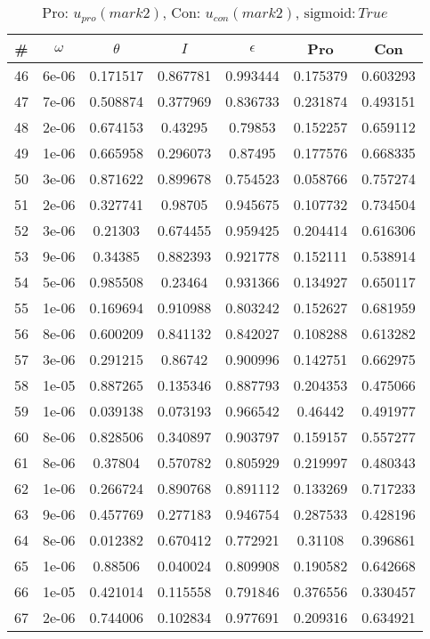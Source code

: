 \newpage
\begin{table}
\caption{Pro: $u_{pro} (mark 2)$, Con: $u_{con} (mark 2)$, $\mathrm{sigmoid}: True$}
\begin{tabular*}{\linewidth}{c|c|c|c|c|c|c}
\# & $\omega$ & $\theta$ & $I$ & $\epsilon$ & Pro & Con \\
\hline
46 & 6e-06 & 0.171517 & 0.867781 & 0.993444 & 0.175379 & 0.603293\\
47 & 7e-06 & 0.508874 & 0.377969 & 0.836733 & 0.231874 & 0.493151\\
48 & 2e-06 & 0.674153 & 0.43295 & 0.79853 & 0.152257 & 0.659112\\
49 & 1e-06 & 0.665958 & 0.296073 & 0.87495 & 0.177576 & 0.668335\\
50 & 3e-06 & 0.871622 & 0.899678 & 0.754523 & 0.058766 & 0.757274\\
51 & 2e-06 & 0.327741 & 0.98705 & 0.945675 & 0.107732 & 0.734504\\
52 & 3e-06 & 0.21303 & 0.674455 & 0.959425 & 0.204414 & 0.616306\\
53 & 9e-06 & 0.34385 & 0.882393 & 0.921778 & 0.152111 & 0.538914\\
54 & 5e-06 & 0.985508 & 0.23464 & 0.931366 & 0.134927 & 0.650117\\
55 & 1e-06 & 0.169694 & 0.910988 & 0.803242 & 0.152627 & 0.681959\\
56 & 8e-06 & 0.600209 & 0.841132 & 0.842027 & 0.108288 & 0.613282\\
57 & 3e-06 & 0.291215 & 0.86742 & 0.900996 & 0.142751 & 0.662975\\
58 & 1e-05 & 0.887265 & 0.135346 & 0.887793 & 0.204353 & 0.475066\\
59 & 1e-06 & 0.039138 & 0.073193 & 0.966542 & 0.46442 & 0.491977\\
60 & 8e-06 & 0.828506 & 0.340897 & 0.903797 & 0.159157 & 0.557277\\
61 & 8e-06 & 0.37804 & 0.570782 & 0.805929 & 0.219997 & 0.480343\\
62 & 1e-06 & 0.266724 & 0.890768 & 0.891112 & 0.133269 & 0.717233\\
63 & 9e-06 & 0.457769 & 0.277183 & 0.946754 & 0.287533 & 0.428196\\
64 & 8e-06 & 0.012382 & 0.670412 & 0.772921 & 0.31108 & 0.396861\\
65 & 1e-06 & 0.88506 & 0.040024 & 0.809908 & 0.190582 & 0.642668\\
66 & 1e-05 & 0.421014 & 0.115558 & 0.791846 & 0.376556 & 0.330457\\
67 & 2e-06 & 0.744006 & 0.102834 & 0.977691 & 0.209316 & 0.634921\\

\end{tabular*}
\end{table}
